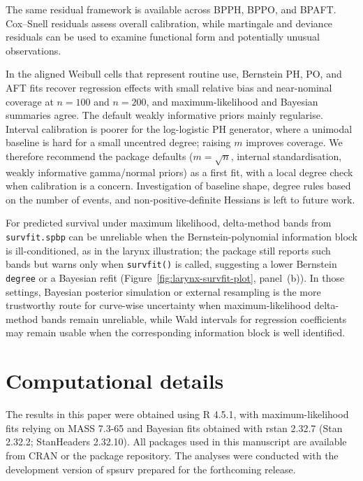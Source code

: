\documentclass[5p,lefttitle]{elsarticle}
\providecommand{\pkg}[1]{\textsf{#1}}
\begin{document}
{The same residual framework is available across BPPH, BPPO, and BPAFT.
Cox–Snell residuals assess overall calibration, while martingale and
deviance residuals can be used to examine functional form and
potentially unusual observations.

In the aligned Weibull cells that represent routine use, Bernstein PH,
PO, and AFT fits recover regression effects with small relative bias and
near-nominal coverage at \(n=100\) and \(n=200\), and maximum-likelihood and Bayesian
summaries agree. The default weakly informative priors mainly regularise.
Interval calibration is poorer for the log-logistic PH generator, where
a unimodal baseline is hard for a small uncentred degree; raising \(m\)
improves coverage. We therefore recommend the package defaults
(\(m=\sqrt{n}\), internal standardisation, weakly informative
gamma/normal priors) as a first fit, with a local degree check when
calibration is a concern. Investigation of baseline shape, degree rules
based on the number of events, and non-positive-definite Hessians is
left to future work.

For predicted survival under maximum likelihood, delta-method bands from
\texttt{survfit.spbp} can be unreliable when the Bernstein-polynomial
information block is ill-conditioned, as in the larynx illustration; the
package still reports such bands but warns only when \texttt{survfit()} is
called, suggesting a lower Bernstein \texttt{degree} or a Bayesian refit (Figure~\ref{fig:larynx-survfit-plot},
panel~(b)). In those settings,
Bayesian posterior simulation or external resampling is the more
trustworthy route for curve-wise uncertainty when maximum-likelihood
delta-method bands remain unreliable, while Wald intervals for
regression coefficients may remain usable when the corresponding
information block is well identified.

\section{Computational details}\label{sec:computational}

The results in this paper were obtained using R 4.5.1, with maximum-likelihood
fits relying on \pkg{MASS} 7.3-65 and Bayesian fits obtained with \pkg{rstan}
2.32.7 (Stan 2.32.2; \pkg{StanHeaders} 2.32.10). All packages used in this
manuscript are available from CRAN or the package repository. The analyses
were conducted with the development version of \pkg{spsurv} prepared for the
forthcoming release.

}
\end{document}
